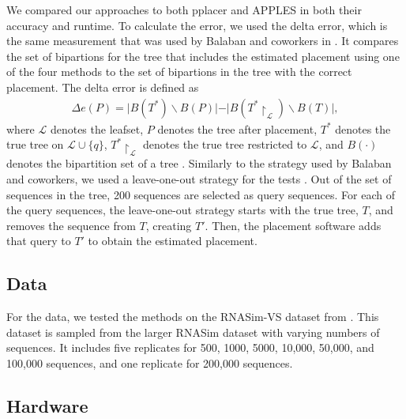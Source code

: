 \documentclass[10pt]{article}
\begin{document}
We compared our approaches to both pplacer and APPLES in both their accuracy and runtime.
To calculate the error, we used the delta error, which is the same measurement that was used by
Balaban and coworkers in \cite{balaban_apples_2020}.
It compares the set of bipartions for the tree that includes the estimated placement using one of the four methods to the set of bipartions in the tree with the correct placement.
The delta error is defined as
\begin{align*}
\Delta e(P) = \vert B(T^*) \backslash B(P) \vert - \vert B(T^* \upharpoonright_{\mathcal L}) \backslash B(T)\vert,
\end{align*}
where $\mathcal L$ denotes the leafset, \(P\) denotes the tree after placement, $T^*$ denotes the true tree on $\mathcal L \cup \{q\}$, $T^* \upharpoonright_{\mathcal L}$ denotes the true tree restricted to $\mathcal L$, and $B(\cdot)$ denotes the bipartition set of a tree \cite{balaban_apples_2020}.
Similarly to the strategy used by Balaban and coworkers, we used a leave-one-out strategy for the tests \cite{balaban_apples_2020}.
Out of the set of sequences in the tree, 200 sequences are selected as query sequences.
For each of the query sequences, the leave-one-out strategy starts with the true tree, \(T\), and removes the sequence from \(T\), creating \(T'\).
Then, the placement software adds that query to \(T'\) to obtain the estimated placement.

\subsection{Data}

For the data, we tested the methods on the RNASim-VS dataset from \cite{balaban_apples_2020}. This dataset is sampled from the larger RNASim dataset with varying numbers of sequences. It includes five replicates for 500, 1000, 5000, 10,000, 50,000, and 100,000 sequences, and one replicate for 200,000 sequences.


\subsection{Hardware}
\end{document}
